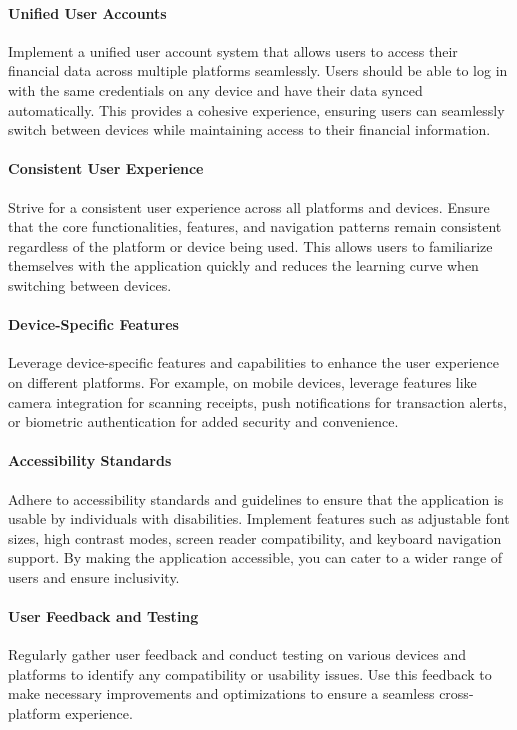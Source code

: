 \paragraph{Unified User Accounts}
Implement a unified user account system that allows users to access their financial data across multiple platforms 
seamlessly. Users should be able to log in with the same credentials on any device and have their data synced 
automatically. This provides a cohesive experience, ensuring users can seamlessly switch between devices while 
maintaining access to their financial information.

\paragraph{Consistent User Experience}
Strive for a consistent user experience across all platforms and devices. Ensure that the core functionalities, 
features, and navigation patterns remain consistent regardless of the platform or device being used. This allows 
users to familiarize themselves with the application quickly and reduces the learning curve when switching between 
devices.

\paragraph{Device-Specific Features}
Leverage device-specific features and capabilities to enhance the user experience on different platforms. For 
example, on mobile devices, leverage features like camera integration for scanning receipts, push notifications 
for transaction alerts, or biometric authentication for added security and convenience.

\paragraph{Accessibility Standards}
Adhere to accessibility standards and guidelines to ensure that the application is usable by individuals with 
disabilities. Implement features such as adjustable font sizes, high contrast modes, screen reader compatibility, 
and keyboard navigation support. By making the application accessible, you can cater to a wider range of users 
and ensure inclusivity.

\paragraph{User Feedback and Testing}
Regularly gather user feedback and conduct testing on various devices and platforms to identify any compatibility 
or usability issues. Use this feedback to make necessary improvements and optimizations to ensure a seamless 
cross-platform experience.\\
\\

